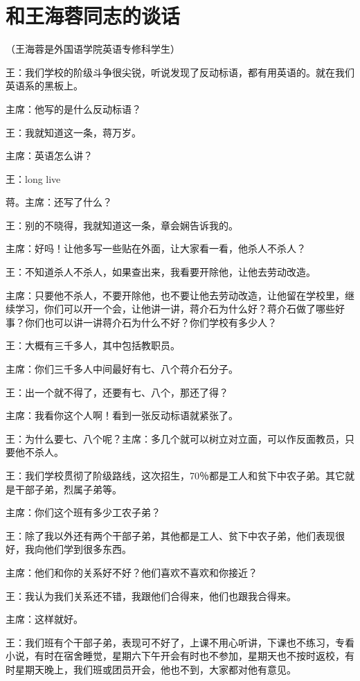 \section[和王海蓉同志的谈话（一九六四年六月二十四日）]{和王海蓉同志的谈话}


（王海蓉是外国语学院英语专修科学生）

王：我们学校的阶级斗争很尖锐，听说发现了反动标语，都有用英语的。就在我们英语系的黑板上。

主席：他写的是什么反动标语？

王：我就知道这一条，蒋万岁。

主席：英语怎么讲？

王：long live

蒋。主席：还写了什么？

王：别的不晓得，我就知道这一条，章会娴告诉我的。

主席：好吗！让他多写一些贴在外面，让大家看一看，他杀人不杀人？

王：不知道杀人不杀人，如果查出来，我看要开除他，让他去劳动改造。

主席：只要他不杀人，不要开除他，也不要让他去劳动改造，让他留在学校里，继续学习，你们可以开一个会，让他讲一讲，蒋介石为什么好？蒋介石做了哪些好事？你们也可以讲一讲蒋介石为什么不好？你们学校有多少人？

王：大概有三千多人，其中包括教职员。

主席：你们三千多人中间最好有七、八个蒋介石分子。

王：出一个就不得了，还要有七、八个，那还了得？

主席：我看你这个人啊！看到一张反动标语就紧张了。

王：为什么要七、八个呢？主席：多几个就可以树立对立面，可以作反面教员，只要他不杀人。

王：我们学校贯彻了阶级路线，这次招生，70％都是工人和贫下中农子弟。其它就是干部子弟，烈属子弟等。

主席：你们这个班有多少工农子弟？

王：除了我以外还有两个干部子弟，其他都是工人、贫下中农子弟，他们表现很好，我向他们学到很多东西。

主席：他们和你的关系好不好？他们喜欢不喜欢和你接近？

王：我认为我们关系还不错，我跟他们合得来，他们也跟我合得来。

主席：这样就好。

王：我们班有个干部子弟，表现可不好了，上课不用心听讲，下课也不练习，专看小说，有时在宿舍睡觉，星期六下午开会有时也不参加，星期天也不按时返校，有时星期天晚上，我们班或团员开会，他也不到，大家都对他有意见。

